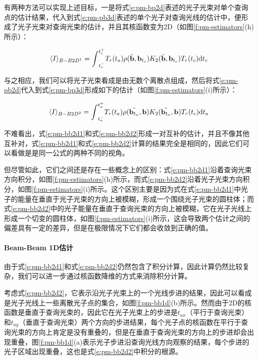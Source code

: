 有两种方法可以实现上述目标，一是将式\ref{e:pm-bp2d}表述的光子光束对单个查询点的估计结果，代入到式\ref{e:pm-pb3d}表述的单个光子对查询光线的估计中，便形成了光子光束对查询光束的估计，并且其核函数变为2D（如图\ref{f:pm-estimators}(h)所示）：

\begin{equation}\label{e:pm-bb2d1}
	\langle I\rangle_{{B-B2D}^{1}}={\rm \int}^{t^{+}_{c}}_{t^{-}_{c}}T_r(t_a) \rho(\tilde{\mathbf{b}},\mathbf{b}_{t_c})K_2(\tilde{\mathbf{b}},\mathbf{b}_{t_c})T_r(t_c){\rm d}t_c
\end{equation}

与之相应，我们可以将光子光束看成是由无数个离散点组成，然后将式\ref{e:pm-pb2d}代入到式\ref{e:pm-bp3d}形成如下的估计（如图\ref{f:pm-estimators}(i)所示）：

\begin{equation}\label{e:pm-bb2d2}
	\langle I\rangle_{{B-B2D}^{2}}={\rm \int}^{t^{+}_{a}}_{t^{-}_{a}}T_r(t_a) \rho(\tilde{\mathbf{b}_{t_a}},\mathbf{b})K_2(\tilde{\mathbf{b}_{t_a}},\mathbf{b})T_r(t_c){\rm d}t_a
\end{equation}

不难看出，式\ref{e:pm-bb2d1}和式\ref{e:pm-bb2d2}形成一对互补的估计，并且不像其他互补对，式\ref{e:pm-bb2d1}和式\ref{e:pm-bb2d2}计算的结果完全是相同的，因此它们可以看做是是同一公式的两种不同的视角。

但尽管如此，它们之间还是存在一些概念上的区别：式\ref{e:pm-bb2d1}沿着查询光束方向积分，如图\ref{f:pm-estimators}(h)所示，而式\ref{e:pm-bb2d2}沿着光子光束方向积分，如图\ref{f:pm-estimators}(i)所示。这个区别主要是因为式在式\ref{e:pm-bb2d1}中光子的能量在垂直于光子光束的方向上被模糊，形成一个围绕光子光束的圆柱体；而式\ref{e:pm-bb2d2}中的光子能量在垂直于查询光束的方向上被模糊，它在光子光线上形成一个切变的圆柱体，如图\ref{f:pm-estimators}(i)所示，这会导致两个估计之间的偏差具有一定的差异，但是在极限情况下它们都会收敛到正确的值。



\paragraph{Beam-Beam 1D估计}
由于式\ref{e:pm-bb2d1}和式\ref{e:pm-bb2d2}仍然包含了积分计算，因此计算仍然比较复杂，我们可以进一步通过核函数降维的方式来消除积分计算。

考虑式\ref{e:pm-bb2d2}，它表示沿光子光束上的一个光线步进的结果，因此可以看成是光子光线上一些离散光子点的集合，如图\ref{f:pm-bb1d}(b)所示。然而由于2D的核函数是垂直于查询光束的，因此它在光子光束上的步进是$t_{ax}$（平行于查询光束）和$t_{ay}$（垂直于查询光束）两个方向的步进结果，每个光子点的核函数在平行于查询光束的方向上肯定是没有重叠的，但是在垂直于查询光束的方向上的步进却会出现重叠，图\ref{f:pm-bb1d}(a)表示光子步进沿查询光线方向观察的结果，每个步进的光子区域出现重叠，这也是式\ref{e:pm-bb2d2}中积分的根源。

